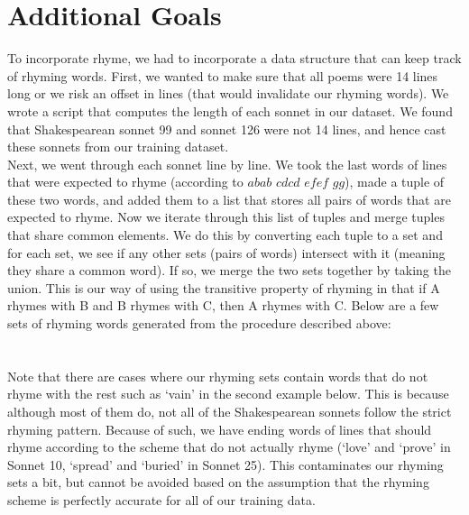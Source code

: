 \documentclass[11pt]{article}
\begin{document}
\section*{Additional Goals}
To incorporate rhyme, we had to incorporate a data structure that can keep track of rhyming words. First, we wanted to make sure that all poems were 14 lines long or we risk an offset in lines (that would invalidate our rhyming words). We wrote a script that computes the length of each sonnet in our dataset. We found that Shakespearean sonnet 99 and sonnet 126 were not 14 lines, and hence cast these sonnets from our training dataset. \\

\noindent Next, we went through each sonnet line by line. We took the last words of lines that were expected to rhyme (according to $\textit{abab cdcd efef gg}$), made a tuple of these two words, and added them to a list that stores all pairs of words that are expected to rhyme. Now we iterate through this list of tuples and merge tuples that share common elements. We do this by converting each tuple to a set and for each set, we see if any other sets (pairs of words) intersect with it (meaning they share a common word). If so, we merge the two sets together by taking the union. This is our way of using the transitive property of rhyming in that if A rhymes with B and B rhymes with C, then A rhymes with C. Below are a few sets of rhyming words generated from the procedure described above: \\

 \\

\\

\noindent Note that there are cases where our rhyming sets contain words that do not rhyme with the rest such as `vain' in the second example below. This is because although most of them do, not all of the Shakespearean sonnets follow the strict rhyming pattern. Because of such, we have ending words of lines that should rhyme according to the scheme that do not actually rhyme (`love' and `prove' in Sonnet 10, `spread' and `buried' in Sonnet 25). This contaminates our rhyming sets a bit, but cannot be avoided based on the assumption that the rhyming scheme is perfectly accurate for all of our training data. \\
\end{document}
